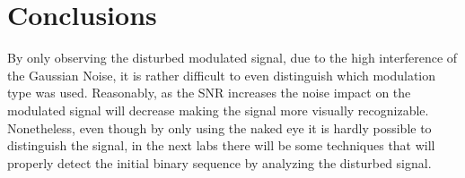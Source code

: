 \section*{Conclusions}
By only observing the disturbed modulated signal, due to the high interference of the Gaussian Noise, it is rather difficult to even distinguish which modulation type was used. Reasonably, as the SNR increases the noise impact on the modulated signal will decrease making the signal more visually recognizable. Nonetheless, even though by only using the naked eye it is hardly possible to distinguish the signal, in the next labs there will be some techniques that will properly detect the initial binary sequence by analyzing the disturbed signal. 




